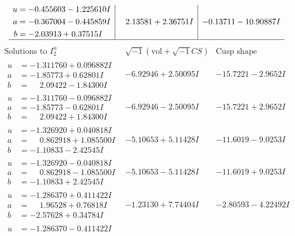 \documentclass[1p]{elsarticle_modified}
\theoremstyle{definition}
\newcommand{\I}{\sqrt{-1}}
\begin{document}
$$\begin{array}{c|c|c}
\begin{aligned}
u &= -0.455603 - 1.225610 I \\
a &= -0.367004 - 0.445859 I \\
b &= -2.03913 + 0.37515 I\end{aligned}
 & \phantom{-}2.13581 + 2.36751 I & -0.13711 - 10.90887 I\\
 \hline 
 \end{array}$$\newpage$$\begin{array}{c|c|c}  
\text{Solutions to }I^u_{2}& \I (\text{vol} + \sqrt{-1}CS) & \text{Cusp shape}\\
 \hline 
\begin{aligned}
u &= -1.311760 + 0.096882 I \\
a &= -1.85773 + 0.62801 I \\
b &= \phantom{-}2.09422 - 1.84300 I\end{aligned}
 & -6.92946 + 2.50095 I & -15.7221 - 2.9652 I \\ \hline\begin{aligned}
u &= -1.311760 - 0.096882 I \\
a &= -1.85773 - 0.62801 I \\
b &= \phantom{-}2.09422 + 1.84300 I\end{aligned}
 & -6.92946 - 2.50095 I & -15.7221 + 2.9652 I \\ \hline\begin{aligned}
u &= -1.326920 + 0.040818 I \\
a &= \phantom{-}0.862918 + 1.085500 I \\
b &= -1.10833 - 2.42545 I\end{aligned}
 & -5.10653 + 5.11428 I & -11.6019 - 9.0253 I \\ \hline\begin{aligned}
u &= -1.326920 - 0.040818 I \\
a &= \phantom{-}0.862918 - 1.085500 I \\
b &= -1.10833 + 2.42545 I\end{aligned}
 & -5.10653 - 5.11428 I & -11.6019 + 9.0253 I \\ \hline\begin{aligned}
u &= -1.286370 + 0.411422 I \\
a &= \phantom{-}1.96528 + 0.76818 I \\
b &= -2.57628 + 0.34784 I\end{aligned}
 & -1.23130 + 7.74404 I & -2.80593 - 4.22492 I \\ \hline\begin{aligned}
u &= -1.286370 - 0.411422 I \\

\end{aligned}
\end{array}$$
\end{document}
